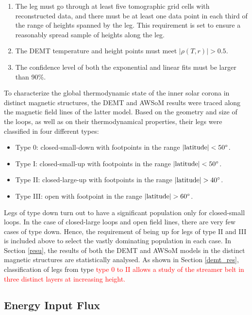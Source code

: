 \documentclass[namedreferences]{solarphysics}
\def\edit#1{\textcolor{Red}{#1}}
\newcommand{\mdeg}{^\circ}
\newcommand{\rhoTr}{\rho(T,r)}
\begin{document}
\begin{article}
\begin{enumerate}
\item 
The leg must go through at least five tomographic grid cells with reconstructed data, and there must be at least one data point in each third of the range of heights spanned by the leg. {This requirement is set to ensure a reasonably spread sample of heights along the leg.}
\item 
The {DEMT temperature and height points must meet} $|\rhoTr| > 0.5$.
\item 
{The confidence level of both the exponential and linear fits must be larger than 90\%.} 
\end{enumerate}

{To characterize the global thermodynamic state of the inner solar corona in distinct magnetic structures, the DEMT and AWSoM results were traced along the magnetic field lines of the latter model. Based on the geometry and size of the loops, as well as on their thermodynamical properties, their legs were classified in four different types:} 

\begin{itemize}
\item Type 0: closed-small-down with footpoints in the range $|{\rm latitude}|<50\mdeg$. 
\item Type I: closed-small-up with footpoints in the range $|{\rm latitude}|<50\mdeg$. 
\item Type II: closed-large-up with footpoints in the range $|{\rm latitude}|>40\mdeg$. 
\item Type III: open with footpoint in the range $|{\rm latitude}|>60\mdeg$.
\end{itemize}

{Legs of type down turn out to have a significant population only for closed-small loops. In the case of closed-large loops and open field lines, there are very few cases of type down. Hence, the requirement of being up for legs of type II and III is included above to select the vastly dominating population in each case}. In Section \ref{resu}, the results of both the DEMT and AWSoM models in the distinct magnetic structures are statistically analysed. {As shown in Section \ref{demt_res}, classification of legs from type \edit{type 0 to II allows a study of the streamer belt in three distinct layers at increasing height.}}

\subsection{{Energy Input Flux}}\label{energia} 


\end{article}
\end{document}
